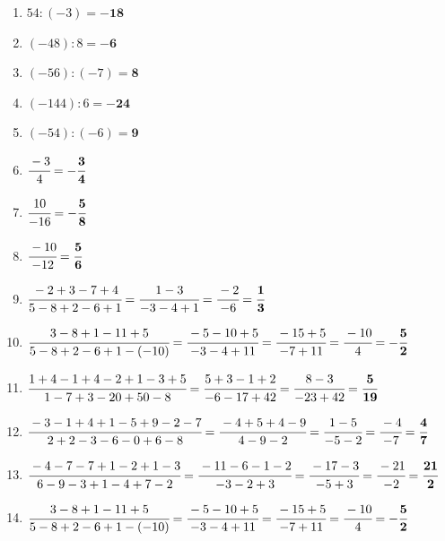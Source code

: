 \documentclass[a4paper,10pt]{article} %
\begin{document}
\begin{enumerate}

  \item \(54 \colon (-3) =
    \mathbf{-18}\) %

  \item \((-48) \colon 8 =
    \mathbf{-6}\) %

  \item \((-56) \colon (-7) =
    \mathbf{8}\) %

  \item \((-144) \colon 6 =
    \mathbf{-24}\) %

  \item \((-54) \colon (-6) =
    \mathbf{9}\) %

  \item \(\cfrac{-3}{4} =
    \mathbf{-\cfrac{3}{4}}\) %

  \item \(\cfrac{10}{-16} =
    \mathbf{-\cfrac{5}{8}}\) %

  \item \(\cfrac{-10}{-12} =
    \mathbf{\cfrac{5}{6}}\) %

  \item \(\cfrac{-2 + 3 - 7 + 4}{5 - 8 + 2 - 6 + 1} =
    \cfrac{1 - 3}{-3 - 4 + 1} =
    \cfrac{-2}{-6} =
    \mathbf{\cfrac{1}{3}}\) %

  \item \(\cfrac{3 - 8 + 1 - 11 + 5}{5 - 8 + 2 - 6 + 1 - (-10)} =
    \cfrac{-5 - 10 + 5}{-3 - 4 + 11} =
    \cfrac{-15 + 5}{-7 + 11} =
    \cfrac{-10}{4} =
    \mathbf{-\cfrac{5}{2}}\) %

  \item \(\cfrac{1 + 4 - 1 + 4 - 2 + 1 - 3 + 5}{1 - 7 + 3 - 20 + 50 - 8} =
    \cfrac{5 + 3 - 1 + 2}{-6 - 17 + 42} =
    \cfrac{8 - 3}{-23 + 42} =
    \mathbf{\cfrac{5}{19}}\) %

  \item \(\cfrac{-3 - 1 + 4 + 1 - 5 + 9 - 2 - 7}{2 + 2 - 3 - 6 - 0 + 6 - 8} =
    \cfrac{-4 + 5 + 4 - 9}{4 - 9 - 2} =
    \cfrac{1 - 5}{-5 - 2} =
    \cfrac{-4}{-7} =
    \mathbf{\cfrac{4}{7}}\) %

  \item \(\cfrac{-4 - 7 - 7 + 1 - 2 + 1 - 3}{6 - 9 - 3 + 1 - 4 + 7 - 2} =
    \cfrac{-11 - 6 - 1 - 2}{-3 - 2 + 3} =
    \cfrac{-17 - 3}{-5 + 3} =
    \cfrac{-21}{-2} =
    \mathbf{\cfrac{21}{2}}\) %

  \item \(\cfrac{3 - 8 + 1 - 11 + 5}{5 - 8 + 2 - 6 + 1 - (-10)} =
    \cfrac{-5 - 10 + 5}{-3 - 4 + 11} =
    \cfrac{-15 + 5}{-7 + 11} =
    \cfrac{-10}{4} =
    \mathbf{-\cfrac{5}{2}}\) %


\end{enumerate}
\end{document}
